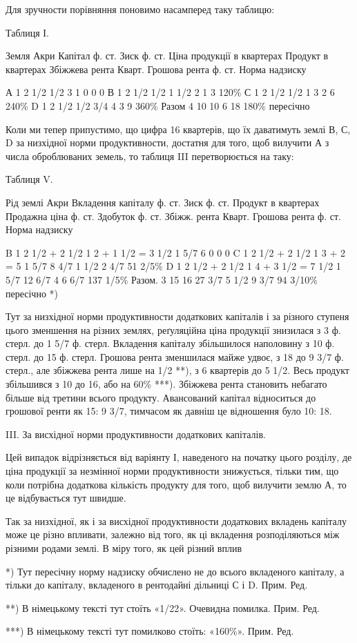 Для зручности порівняння поновимо насамперед таку таблицю:

Таблиця І.

Земля    Акри    Капітал ф. ст. Зиск ф. ст. Ціна продукції в квартерах    Продукт в квартерах   
Збіжжева рента Кварт. Грошова  рента ф. ст. Норма надзиску

А    1    2 1/2    1/2    3       1     0    0    0
В    1    2 1/2    1/2    1 1/2   2     1    3    120\%
С    1    2 1/2    1/2    1       3     2    6    240\%
D    1    2 1/2    1/2    3/4       4    3    9      360\%
Разом   4    10          10   6      18    180\%  пересічно

Коли ми тепер припустимо, що цифра 16 квартерів, що їх даватимуть землі
В, С, D за низхідної норми продуктивности, достатня для того, щоб вилучити
А з числа оброблюваних земель, то таблиця III перетворюється на таку:

Таблиця V.

Рід  землі    Акри    Вкладення  капіталу ф. ст. Зиск ф. ст. Продукт в квартерах    Продажна ціна ф.
ст. Здобуток ф. ст. Збіжж. рента Кварт. Грошова рента ф. ст. Норма надзиску

B     1    2 1/2 + 2 1/2    1    2 + 1 1/2 = 3 1/2    1 5/7    6            0            0          
 0
C    1    2 1/2 + 2 1/2    1    3 + 2 = 5                    1 5/7    8 4/7    1 1/2     2 4/7    51
2/5\%
D    1    2 1/2 + 2 1/2    1      4 + 3 1/2 = 7 1/2    1 5/7    12 6/7    4            6 6/7    137
1/5\%
Разом.    3    15        16        27 3/7  5 1/2     9 3/7     94 3/10\%  пересічно *)

Тут за низхідної норми продуктивности додаткових капіталів і за різного
ступеня цього зменшення на різних землях, реґуляційна ціна продукції знизилася
з 3 ф. стерл. до 1 5/7 ф. стерл. Вкладення капіталу збільшилося наполовину з 10 ф.
стерл. до 15 ф. стерл. Грошова рента зменшилася майже удвоє, з 18 до 9 3/7 ф.
стерл., але збіжжева рента лише на 1/2 **), з 6 квартерів до 5 1/2. Весь продукт
збільшився з 10 до 16, або на 60\% ***). Збіжжева рента становить небагато більше
від третини всього продукту. Авансований капітал відноситься до грошової ренти
як 15: 9 3/7, тимчасом як давніш це відношення було 10: 18.

III. За висхідної норми продуктивности додаткових капіталів.

Цей випадок відрізняється від варіянту І, наведеного на початку цього
розділу, де ціна продукції за незмінної норми продуктивности знижується, тільки
тим, що коли потрібна додаткова кількість продукту для того, щоб вилучити
землю А, то це відбувається тут швидше.

Так за низхідної, як і за висхідної продуктивности додаткових вкладень
капіталу може це різно впливати, залежно від того, як ці вкладення розподіляються
між різними родами землі. В міру того, як цей різний вплив

*) Тут пересічну норму надзиску обчислено не до всього вкладеного капіталу, а тільки до капіталу,
вкладеного в рентодайні дільниці С і D. Прим. Ред.

**) В німецькому тексті тут стоїть «1/22». Очевидна помилка. Прим. Ред.

***) В німецькому тексті тут помилково стоїть: «160\%». Прим. Ред.
